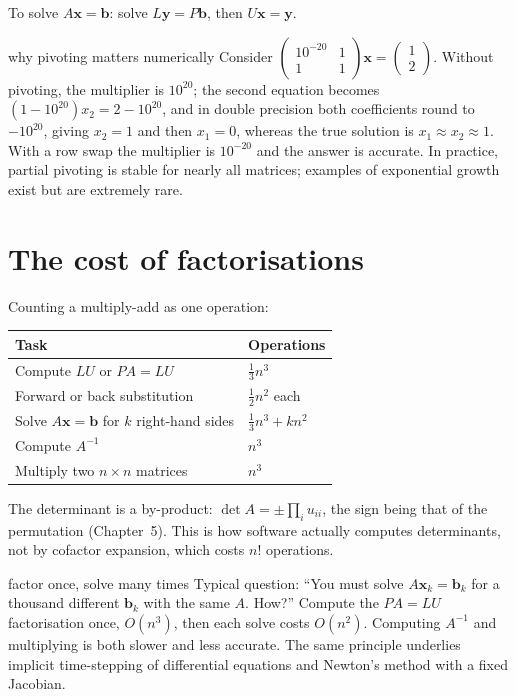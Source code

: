 To solve $A\mathbf{x}=\mathbf{b}$: solve $L\mathbf{y}=P\mathbf{b}$, then $U\mathbf{x}=\mathbf{y}$.

\begin{nuance}{why pivoting matters numerically}
Consider $\begin{pmatrix}10^{-20}&1\\1&1\end{pmatrix}\mathbf{x}=\begin{pmatrix}1\\2\end{pmatrix}$. Without pivoting, the multiplier is $10^{20}$; the second equation becomes $(1-10^{20})x_2=2-10^{20}$, and in double precision both coefficients round to $-10^{20}$, giving $x_2=1$ and then $x_1=0$, whereas the true solution is $x_1\approx x_2\approx1$. With a row swap the multiplier is $10^{-20}$ and the answer is accurate. In practice, partial pivoting is stable for nearly all matrices; examples of exponential growth exist but are extremely rare.
\end{nuance}

\section{The cost of factorisations}

Counting a multiply-add as one operation:
\begin{center}
\begin{tabular}{ll}
\toprule
Task & Operations \\
\midrule
Compute $LU$ or $PA=LU$ & $\tfrac13n^3$ \\
Forward or back substitution & $\tfrac12n^2$ each \\
Solve $A\mathbf{x}=\mathbf{b}$ for $k$ right-hand sides & $\tfrac13n^3+kn^2$ \\
Compute $A^{-1}$ & $n^3$ \\
Multiply two $n\times n$ matrices & $n^3$ \\
\bottomrule
\end{tabular}
\end{center}

The determinant is a by-product: $\det A=\pm\prod_i u_{ii}$, the sign being that of the permutation (Chapter~5). This is how software actually computes determinants, not by cofactor expansion, which costs $n!$ operations.

\begin{interview}{factor once, solve many times}
Typical question: ``You must solve $A\mathbf{x}_k=\mathbf{b}_k$ for a thousand different $\mathbf{b}_k$ with the same $A$. How?'' Compute the $PA=LU$ factorisation once, $O(n^3)$, then each solve costs $O(n^2)$. Computing $A^{-1}$ and multiplying is both slower and less accurate. The same principle underlies implicit time-stepping of differential equations and Newton's method with a fixed Jacobian.
\end{interview}


